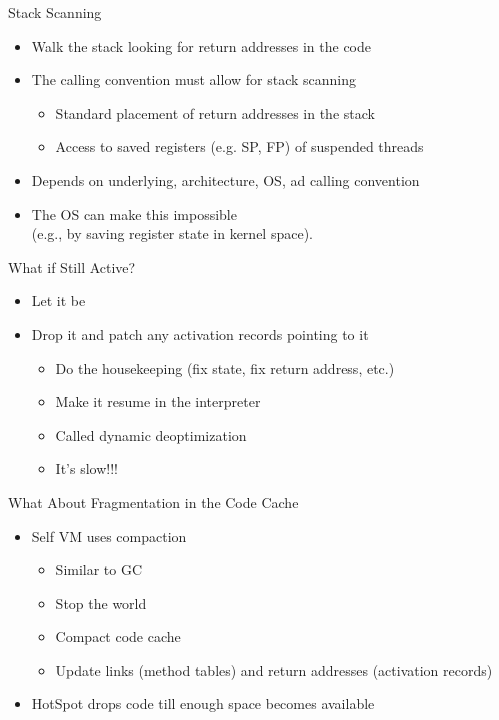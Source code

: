 \documentclass[
14pt,
aspectratio=169,
usenames,
dvipsnames,
x11names]{beamer}
\begin{document}
\begin{frame}{Stack Scanning}
  \begin{itemize}  \setlength{\itemsep}{\fill}
  \item \alert{Walk the stack} looking for return addresses in the code
  \item The \alert{calling convention} must allow for stack scanning
    \begin{itemize}
    \item Standard placement of return addresses in the stack
    \item Access to saved registers (e.g. SP, FP) of suspended threads
    \end{itemize}
  \item Depends on underlying, architecture, OS, ad calling convention
  \item The OS can make this \alert{impossible}\\
    (e.g., by saving register state in kernel space).
  \end{itemize}
\end{frame}

\begin{frame}{What if Still Active?}
  \begin{itemize}  \setlength{\itemsep}{\fill}
  \item Let it be
  \item Drop it and patch any activation records pointing to it
    \begin{itemize}
    \item Do the housekeeping (fix state, fix return address, etc.)
    \item Make it resume in the interpreter
    \item Called \alert{dynamic deoptimization}
    \item It's slow!!!
    \end{itemize}
  \end{itemize}
\end{frame}

\begin{frame}{What About Fragmentation in the Code Cache}
  \begin{itemize}  \setlength{\itemsep}{\fill}
  \item Self VM uses \alert{compaction}
    \begin{itemize}
    \item Similar to GC
    \item Stop the world
    \item Compact code cache
    \item Update links (method tables) and return addresses (activation records)
    \end{itemize}
  \item HotSpot\texttrademark{} drops code till enough space becomes available
  \end{itemize}
\end{frame}
\end{document}
